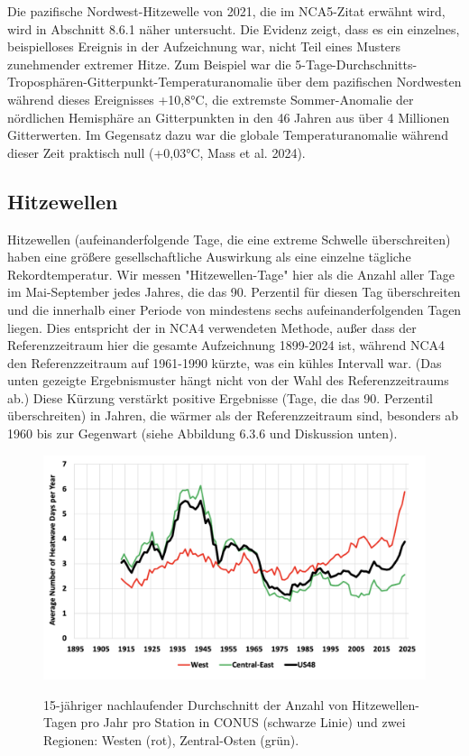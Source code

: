 \documentclass[12pt,paper=a4,DIV=12,parskip=never,chapterprefix=false,headings=standardclasses]{scrreprt}
\begin{document}
Die pazifische Nordwest-Hitzewelle von 2021, die im NCA5-Zitat erwähnt wird, wird in Abschnitt 8.6.1 näher untersucht. Die Evidenz zeigt, dass es ein einzelnes, beispielloses Ereignis in der Aufzeichnung war, nicht Teil eines Musters zunehmender extremer Hitze. Zum Beispiel war die 5-Tage-Durchschnitts-Troposphären-Gitterpunkt-Temperaturanomalie über dem pazifischen Nordwesten während dieses Ereignisses +10,8°C, die extremste Sommer-Anomalie der nördlichen Hemisphäre an Gitterpunkten in den 46 Jahren aus über 4 Millionen Gitterwerten. Im Gegensatz dazu war die globale Temperaturanomalie während dieser Zeit praktisch null (+0,03°C, Mass et al. 2024).

\subsection{Hitzewellen}
Hitzewellen (aufeinanderfolgende Tage, die eine extreme Schwelle überschreiten) haben eine größere gesellschaftliche Auswirkung als eine einzelne tägliche Rekordtemperatur. Wir messen "Hitzewellen-Tage" hier als die Anzahl aller Tage im Mai-September jedes Jahres, die das 90. Perzentil für diesen Tag überschreiten und die innerhalb einer Periode von mindestens sechs aufeinanderfolgenden Tagen liegen. Dies entspricht der in NCA4 verwendeten Methode, außer dass der Referenzzeitraum hier die gesamte Aufzeichnung 1899-2024 ist, während NCA4 den Referenzzeitraum auf 1961-1990 kürzte, was ein kühles Intervall war. (Das unten gezeigte Ergebnismuster hängt nicht von der Wahl des Referenzzeitraums ab.) Diese Kürzung verstärkt positive Ergebnisse (Tage, die das 90. Perzentil überschreiten) in Jahren, die wärmer als der Referenzzeitraum sind, besonders ab 1960 bis zur Gegenwart (siehe Abbildung 6.3.6 und Diskussion unten).

\begin{figure}[H]
\begin{center}
\includegraphics[width=1.0\textwidth]{bilder/bilderKlima-0047.png}\\[1cm]
\end{center}
\caption{15-jähriger nachlaufender Durchschnitt der Anzahl von Hitzewellen-Tagen pro Jahr pro Station in CONUS (schwarze Linie) und zwei Regionen: Westen (rot), Zentral-Osten (grün).}
\end{figure}
\end{document}
